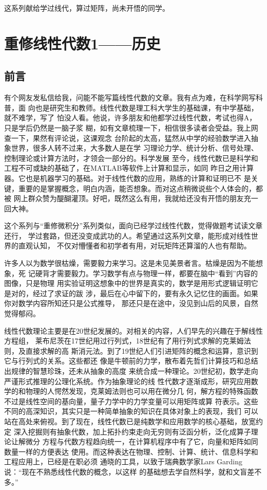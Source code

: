 这系列献给学过线代，算过矩阵，尚未开悟的同学。
\section{重修线性代数1——历史}
\subsection{前言}
有个网友发私信给我，问能不能写篇线性代数的文章。我有点为难，在科学网写科普，面
向也是研究生和教师。线性代数是理工科大学生的基础课，有中学基础，就不难学，写了
怕没人看。他说，许多朋友和他都学过线性代数，考试也得A，只是学后仍然是一脑子浆
糊，如有文章梳理一下，相信很多读者会受益。我上网查一下，果然有评论说，这课观念
台阶起的太高，猛然从中学的经验数学进入抽象世界，很多人转不过来，大多数人是在学
习理论力学、统计分析、信号处理、控制理论或计算方法时，才领会一部分的。科学发展
至今，线性代数已是科学和工程不可或缺的基础了，在MATLAB等软件上计算和显示，如同
昨日之用计算器。它也是机器学习的基础。对于线性代数的应用，熟练的计算和证明已不
是关键，重要的是掌握概念，明白内涵，能否想象。而对这点稍微说些个人体会的，都被
网上群众赞为醍醐灌顶。好吧，既然这么有用，我就给还没有开悟的朋友充一回大神。

这个系列与“重修微积分”系列类似，面向已经学过线性代数，觉得做题考试读文章还行，
学过套路，但还没变成武功的人。希望通过这系列文章，能形成对线性世界的直观认知，
不仅对懵懂者和初学者有用，对玩矩阵还算溜的人也有帮助。

许多人以为数学很枯燥，需要毅力来学习。这是未见美景者言。枯燥是因为不能想象，死
记硬背才需要毅力。学习数学有点与物理一样，都要在脑中“看到”内容的图像，只是物理
用实验证明这想象中的世界是真实的，数学是用形式逻辑证明它是对的，经过了求证的跋
涉，最后在心中留下的，要有永久记忆住的画面。如果你对数学内容所知还只是公式推导，
那还只是在途中，没见到山后的风景，自然觉得郁闷。

线性代数理论主要是在20世纪发展的。对相关的内容，人们早先的兴趣在于解线性方程组，
莱布尼茨在17世纪用过行列式，18世纪有了用行列式求解的克莱姆法则，及直接求解的高
斯消元法。到了19世纪人们引进矩阵的概念和运算，意识到它与行列式的关系。这些都还
像是牛顿前的力学，散布着先哲们计算技巧和总结出规律的智慧珍珠，还未从抽象的高度
来统合成一种理论。20世纪初，数学走向严谨形式推理的公理化系统。作为抽象理论的线
性代数才逐渐成形，研究应用数学的和物理的人愕然发现，克莱姆法则也可以用在微分几
何，解方程的特殊函数不过是线性空间的基向量，量子力学中的力学变量可以用矩阵或算
符表示。这些不同的高深知识，其实只是一种简单抽象的知识在具体对象上的表现，我们
可以站在高处来俯视。到了现在，线性代数已是纯数学和应用数学的核心基础，放宽约定
深入挖掘则有抽象代数，加上拓扑约束走向无穷则有泛函分析，泛化成算子理论让解微分
方程与代数方程趋向统一，在计算机程序中有了它，向量和矩阵如同数量一样的方便表达
使用。而这种表达在物理、控制、计算、统计、信息科学和工程应用上，已经是在职必须
通晓的工具，以致于瑞典数学家Lars Garding说：“现在不熟悉线性代数的概念，以这样
的基础想去学自然科学，就和文盲差不多。”

